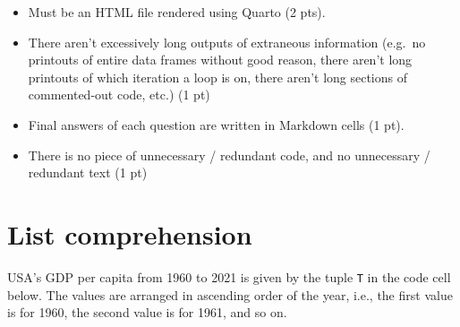 \documentclass[
  letterpaper,
  DIV=11,
  numbers=noendperiod]{scrreprt}
\providecommand{\tightlist}{%
  \setlength{\itemsep}{0pt}\setlength{\parskip}{0pt}}\usepackage{longtable,booktabs,array}
\begin{document}
\begin{itemize}
\tightlist
\item
  Must be an HTML file rendered using Quarto (2 pts).
\item
  There aren't excessively long outputs of extraneous information
  (e.g.~no printouts of entire data frames without good reason, there
  aren't long printouts of which iteration a loop is on, there aren't
  long sections of commented-out code, etc.) (1 pt)
\item
  Final answers of each question are written in Markdown cells (1 pt).
\item
  There is no piece of unnecessary / redundant code, and no unnecessary
  / redundant text (1 pt)
\end{itemize}

\hypertarget{list-comprehension}{%
\section{List comprehension}\label{list-comprehension}}

USA's GDP per capita from 1960 to 2021 is given by the tuple \texttt{T}
in the code cell below. The values are arranged in ascending order of
the year, i.e., the first value is for 1960, the second value is for
1961, and so on.
\end{document}
